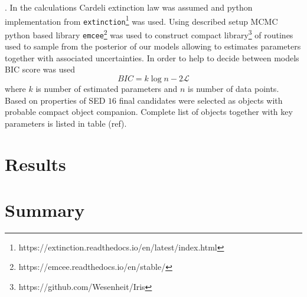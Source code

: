\documentclass{pracalicmgr}
\begin{document}
\citep{drimmel_three-dimensional_2003}. In the calculations Cardeli extinction law was assumed \citep{cardelli_relationship_1989}
and python implementation from \texttt{extinction}\footnote{https://extinction.readthedocs.io/en/latest/index.html} was used.
Using described setup MCMC python based library \texttt{emcee}\footnote{https://emcee.readthedocs.io/en/stable/} \citep{foreman-mackey_emcee_2013}
was used to construct compact library\footnote{https://github.com/Wesenheit/Iris} of routines used to sample from the posterior of our models allowing to estimates parameters together
with associated uncertainties. In order to help to decide between models 
BIC score was used 
\begin{equation}
    BIC=k\log{n}-2\mathcal{L}
\end{equation} where $k$ is number of estimated parameters and $n$ is  number of data points. Based on properties of SED $16$ final candidates were selected as objects with probable 
compact object companion. Complete list of objects together with key parameters is listed in table (ref).

\chapter{Results}
\section{}
\chapter{Summary}

 

\end{document}
